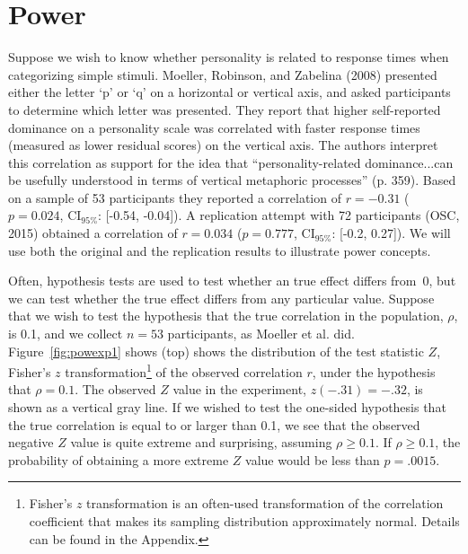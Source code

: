 \documentclass[doc,a4paper,floatsintext,draftfirst]{apa6}
\begin{document}
\section{Power}

Suppose we wish to know whether personality is related to response times when categorizing simple stimuli. Moeller, Robinson, and Zabelina (2008) presented either the letter `p' or `q' on a horizontal or vertical axis, and asked participants to determine which letter was presented. They report that higher self-reported dominance on a personality scale was correlated with faster response times (measured as lower residual scores) on the vertical axis. The authors interpret this correlation as support for the idea that ``personality-related dominance...can be usefully understood in terms of vertical metaphoric processes'' (p. 359). Based on a sample of 53 participants they reported a correlation of $r=-0.31$ ($p=0.024$, CI$_{95\%}$: [-0.54, -0.04]). A replication attempt with 72 participants (OSC, 2015) obtained a correlation of $r=0.034$ ($p=0.777$, CI$_{95\%}$: [-0.2, 0.27]). We will use both the original and the replication results to illustrate power concepts.

\nocite{Moeller:etal:2008}

Often, hypothesis tests are used to test whether an true effect differs from~0, but we can test whether the true effect differs from any particular value. Suppose that we wish to test the hypothesis that the true correlation in the population, $\rho$, is 0.1, and we collect $n=53$ participants, as Moeller et al. did. Figure~\ref{fig:powexp1} shows (top) shows the distribution of the test statistic $Z$, Fisher's $z$ transformation\footnote{Fisher's $z$ transformation is an often-used transformation of the correlation coefficient that makes its sampling distribution approximately normal. Details can be found in the Appendix.} of the observed correlation $r$, under the hypothesis that $\rho=0.1$. The observed $Z$ value in the experiment, $z(-.31)=-.32$, is shown as a vertical gray line. If we wished to test the one-sided hypothesis that the true correlation is equal to or larger than 0.1, we see that the observed negative $Z$ value is quite extreme and surprising, assuming $\rho\geq0.1$. If $\rho\geq0.1$, the probability of obtaining a more extreme $Z$ value would be less than $p=.0015$. 
\end{document}
